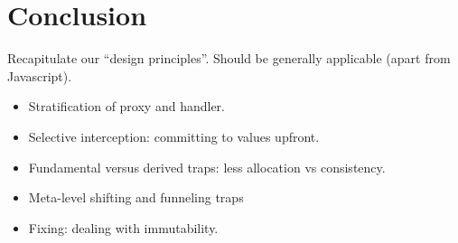 \documentclass{acm_proc_article-sp}
\begin{document}
\section{Conclusion}

Recapitulate our ``design principles''. Should be generally applicable (apart from Javascript).
\begin{itemize}
  \item Stratification of proxy and handler.
  \item Selective interception: committing to values upfront.
  \item Fundamental versus derived traps: less allocation vs consistency.
  \item Meta-level shifting and funneling traps
  \item Fixing: dealing with immutability.
\end{itemize}



\end{document}
